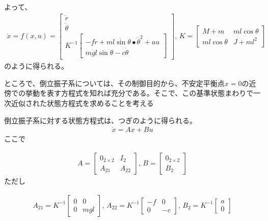 \documentclass[a4j,11pt,twoside]{ujbook}
\begin{document}
			よって、
			\begin{eqnarray}
				\dot{x}
				=
				f(x,u)
				=
				\left[
					\begin{array}{c}
						\dot{r}\\
						\dot{\theta}\\
						K^{-1}\left[
						\begin{array}{c}
							- f \dot{r} + ml\sin{\theta}\bullet\dot{\theta}^2 + au\\
							mgl\sin{\theta} - c\dot{\theta}
						\end{array}
						\right]
					\end{array}
				\right],\,
				K 
				= 
				\left[
					\begin{array}{cc}
						M+m & ml\cos{\theta}\\
						ml\cos{\theta} & J+ml^2
					\end{array}
				\right]
			\end{eqnarray}
			のように得られる。

			ところで、倒立振子系については、その制御目的から、不安定平衡点$x=0$の近傍での挙動を表す方程式を知れば充分である。そこで、この基準状態まわりで一次近似された状態方程式を求めることを考える
			
			倒立振子系に対する状態方程式は、つぎのように得られる。
			\begin{eqnarray}
				\dot{x} = Ax + Bu
				\label{eq:xdot}
			\end{eqnarray}
			ここで

			\begin{eqnarray*}
				A = \left[
				\begin{array}{cc}
					0_{2\times2} & I_2\\
					A_{21} & A_{22}
				\end{array}
				\right],\,
				B = \left[
				\begin{array}{c}
					0_{2\times2}\\
					B_2
				\end{array}
				\right]
			\end{eqnarray*}
			ただし

			\begin{eqnarray*}
				A_{21} = K^{-1}\left[
				\begin{array}{cc}
					0 &  0 \\
					0 & mgl
				\end{array}
				\right],\,
				A_{22} = K^{-1}\left[
				\begin{array}{cc}
					-f &  0 \\
					0 & -c
				\end{array}
				\right]
				,\,
				B_{2} = K^{-1}\left[
				\begin{array}{c}
					a\\
					0
				\end{array}
				\right]
				\nonumber
			\end{eqnarray*}
\end{document}
